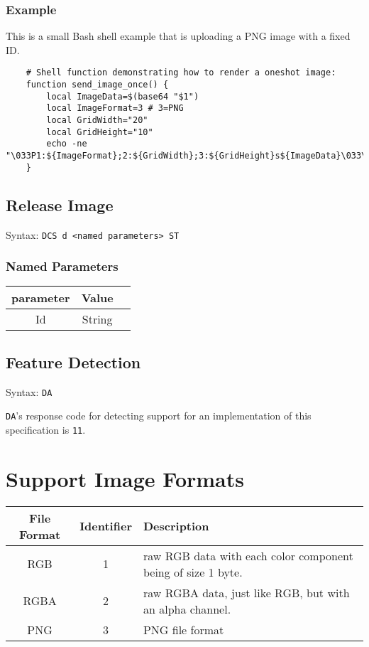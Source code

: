 \documentclass{article}
\newcommand{\code}[1]{\colorbox{light-gray}{\texttt{#1}}}
\newcommand{\DA}{\code{DA}}
\begin{document}
\subsubsection*{Example}

This is a small Bash shell example that is uploading a PNG image with a fixed ID.

\begin{verbatim}
    # Shell function demonstrating how to render a oneshot image:
    function send_image_once() {
        local ImageData=$(base64 "$1")
        local ImageFormat=3 # 3=PNG
        local GridWidth="20"
        local GridHeight="10"
        echo -ne "\033P1:${ImageFormat};2:${GridWidth};3:${GridHeight}s${ImageData}\033\\"
    }
\end{verbatim}

\subsection{Release Image}

Syntax: \code{DCS d <named parameters> ST}

\subsubsection*{Named Parameters}

\begin{tabular}{ |c|c|l| }
    \hline
    \textbf{parameter}   & \textbf{Value} \\
    \hline
    Id          & String \\
    \hline
\end{tabular}

\subsection{Feature Detection}

Syntax: \DA

\DA's response code for detecting support for an implementation of this specification is \code{11}.

\section{Support Image Formats} %

\label{sec:supported-image-formtats}

\begin{tabular}{c | c | l}
    File Format & Identifier & Description \\ \hline
    RGB & 1 & raw RGB data with each color component being of size 1 byte. \\
    RGBA & 2 & raw RGBA data, just like RGB, but with an alpha channel. \\
    PNG & 3 & PNG file format \\
\end{tabular}
\end{document}
